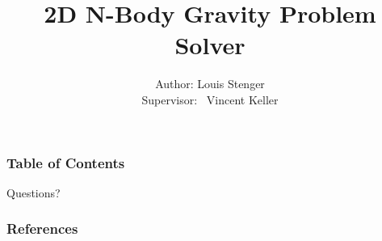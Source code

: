 \documentclass[11pt]{beamer}
\begin{document}
	\author{Author: Louis Stenger\\Supervisor:~ Vincent Keller}
	\title{2D N-Body Gravity Problem Solver}
	\date{}
	\begin{frame}
		\maketitle
	\end{frame}
	
	\begin{frame}
		\frametitle{Table of Contents}
		\tableofcontents
	\end{frame}
	
	
	
	
	\begin{frame}[standout]
		Questions?
	\end{frame}
	\begin{frame}[t,allowframebreaks]
		\frametitle{References}
		\renewcommand{\bibfont}{\normalfont\footnotesize}
		\printbibliography[heading=none]
	\end{frame}
	
\end{document}

